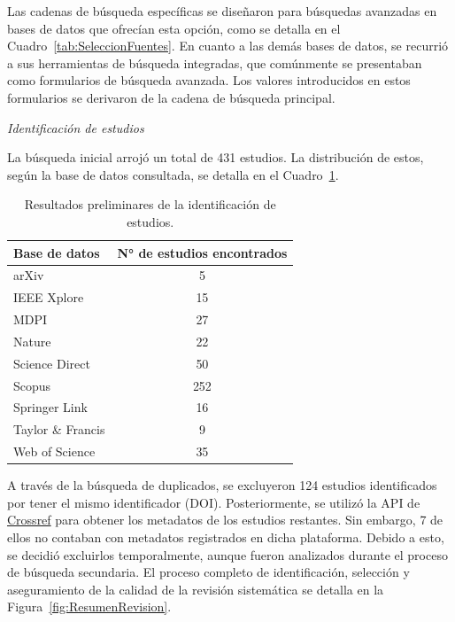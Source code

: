 Las cadenas de búsqueda específicas se diseñaron para búsquedas avanzadas en bases de datos que ofrecían esta opción, como se detalla en el Cuadro~\ref{tab:SeleccionFuentes}. En cuanto a las demás bases de datos, se recurrió a sus herramientas de búsqueda integradas, que comúnmente se presentaban como formularios de búsqueda avanzada. Los valores introducidos en estos formularios se derivaron de la cadena de búsqueda principal.

\textit{Identificación de estudios}

La búsqueda inicial arrojó un total de 431 estudios. La distribución de estos, según la base de datos consultada, se detalla en el Cuadro~\ref{tab:ResultadoPrimario}.

\begin{table}[H]
\small
\caption{Resultados preliminares de la identificación de estudios.}
\begin{tabularx}{\textwidth}{p{8.5cm}c}
\hline
\textbf{Base de datos} & \textbf{N° de estudios encontrados}\\
\hline
arXiv & 5 \\\hline
IEEE Xplore & 15 \\\hline
MDPI & 27 \\\hline
Nature & 22 \\\hline
Science Direct & 50 \\\hline
Scopus & 252 \\\hline
Springer Link & 16 \\\hline
Taylor \& Francis & 9 \\\hline
Web of Science & 35 \\
\hline
\end{tabularx}
\label{tab:ResultadoPrimario}
\end{table}

A través de la búsqueda de duplicados, se excluyeron 124 estudios identificados por tener el mismo identificador (DOI). Posteriormente, se utilizó la API de \href{https://www.crossref.org}{Crossref} para obtener los metadatos de los estudios restantes. Sin embargo, 7 de ellos no contaban con metadatos registrados en dicha plataforma. Debido a esto, se decidió excluirlos temporalmente, aunque fueron analizados durante el proceso de búsqueda secundaria. El proceso completo de identificación, selección y aseguramiento de la calidad de la revisión sistemática se detalla en la Figura~\ref{fig:ResumenRevision}.

